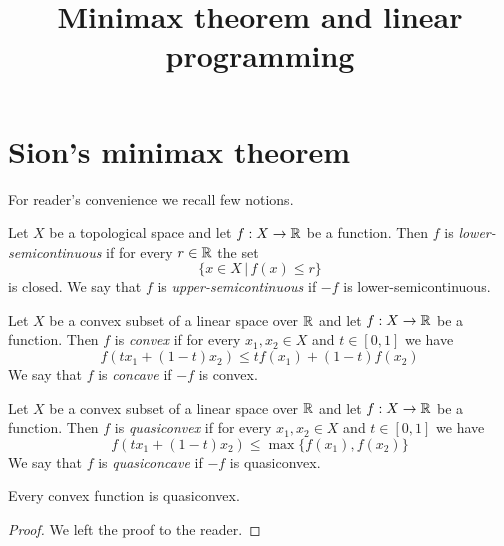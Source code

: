 



\title{Minimax theorem and linear programming}
\date{}
\maketitle

\section{Sion's minimax theorem}
\noindent
For reader's convenience we recall few notions.

\begin{definition}
Let $X$ be a topological space and let $f:X \rightarrow {\mathbb R}$ be a function. Then $f$ is \textit{lower-semicontinuous} if for every $r \in {\mathbb R}$ the set
$$\{x\in X\,|\,f(x) \leq r \}$$
is closed. We say that $f$ is \textit{upper-semicontinuous} if $-f$ is lower-semicontinuous.
\end{definition}

\begin{definition}
Let $X$ be a convex subset of a linear space over ${\mathbb R}$ and let $f:X \rightarrow {\mathbb R}$ be a function. Then $f$ is \textit{convex} if for every $x_1, x_2\in X$ and $t\in [0,1]$ we have
$$f\left(tx_1 + (1-t)x_2\right)\leq tf(x_1) + (1-t)f(x_2)$$
We say that $f$ is \textit{concave} if $-f$ is convex.
\end{definition}

\begin{definition}
Let $X$ be a convex subset of a linear space over ${\mathbb R}$ and let $f:X \rightarrow {\mathbb R}$ be a function. Then $f$ is \textit{quasiconvex} if for every $x_1, x_2\in X$ and $t\in [0,1]$ we have
$$f\left(tx_1 + (1-t)x_2\right) \leq \max\big\{f(x_1),f(x_2)\big\}$$
We say that $f$ is \textit{quasiconcave} if $-f$ is quasiconvex.
\end{definition}

\begin{fact}\label{fact:conveximpliesquasiconvex}
Every convex function is quasiconvex.
\end{fact}
\begin{proof}
We left the proof to the reader.
\end{proof}

